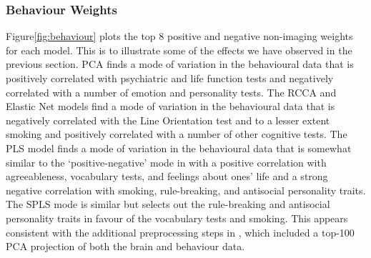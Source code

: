 \subsubsection{Behaviour Weights}

Figure\ref{fig:behaviour} plots the top 8 positive and negative non-imaging \gls{weights} for each model.
This is to illustrate some of the effects we have observed in the previous section.
PCA finds a mode of variation in the behavioural data that is positively correlated with psychiatric and life function tests and negatively correlated with a number of emotion and personality tests.
The RCCA and Elastic Net models find a mode of variation in the behavioural data that is negatively correlated with the Line Orientation test and to a lesser extent smoking and positively correlated with a number of other cognitive tests.
The PLS model finds a mode of variation in the behavioural data that is somewhat similar to the `positive-negative' mode in \citet{smith2015positive} with a positive correlation with agreeableness, vocabulary tests, and feelings about ones' life and a strong negative correlation with smoking, rule-breaking, and antisocial personality traits.
The SPLS mode is similar but selects out the rule-breaking and antisocial personality traits in favour of the vocabulary tests and smoking. This appears consistent with the additional preprocessing steps in \citet{smith2015positive}, which included a top-100 PCA projection of both the brain and behaviour data.

